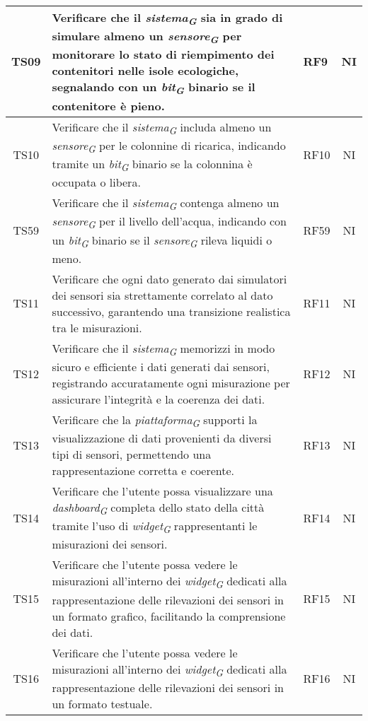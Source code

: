 \begin{longtable}{|c|p{5cm}|>{\raggedright}p{2cm}|c|}
        \hline
        TS09 & Verificare che il \textit{sistema}\textsubscript{\textit{G}} sia in grado di simulare almeno un \textit{sensore}\textsubscript{\textit{G}} per monitorare lo stato di riempimento dei contenitori nelle isole ecologiche, segnalando con un \textit{bit}\textsubscript{\textit{G}} binario se il contenitore è pieno. & RF9 & NI \\
        \hline
        TS10 & Verificare che il \textit{sistema}\textsubscript{\textit{G}} includa almeno un \textit{sensore}\textsubscript{\textit{G}} per le colonnine di ricarica, indicando tramite un \textit{bit}\textsubscript{\textit{G}} binario se la colonnina è occupata o libera. & RF10 & NI \\
        \hline
        TS59 & Verificare che il \textit{sistema}\textsubscript{\textit{G}} contenga almeno un \textit{sensore}\textsubscript{\textit{G}} per il livello dell'acqua, indicando con un \textit{bit}\textsubscript{\textit{G}} binario se il \textit{sensore}\textsubscript{\textit{G}} rileva liquidi o meno. & RF59 & NI \\
        \hline
        TS11 & Verificare che ogni dato generato dai simulatori dei sensori sia strettamente correlato al dato successivo, garantendo una transizione realistica tra le misurazioni. & RF11 & NI \\
        \hline
        TS12 & Verificare che il \textit{sistema}\textsubscript{\textit{G}} memorizzi in modo sicuro e efficiente i dati generati dai sensori, registrando accuratamente ogni misurazione per assicurare l'integrità e la coerenza dei dati. & RF12 & NI \\
        \hline
        TS13 & Verificare che la \textit{piattaforma}\textsubscript{\textit{G}} supporti la visualizzazione di dati provenienti da diversi tipi di sensori, permettendo una rappresentazione corretta e coerente. & RF13 & NI \\
        \hline
        TS14 & Verificare che l'utente possa visualizzare una \textit{dashboard}\textsubscript{\textit{G}} completa dello stato della città tramite l'uso di \textit{widget}\textsubscript{\textit{G}} rappresentanti le misurazioni dei sensori. & RF14 & NI \\
        \hline
        TS15 & Verificare che l'utente possa vedere le misurazioni all'interno dei \textit{widget}\textsubscript{\textit{G}} dedicati alla rappresentazione delle rilevazioni dei sensori in un formato grafico, facilitando la comprensione dei dati. & RF15 & NI \\
        \hline
        TS16 & Verificare che l'utente possa vedere le misurazioni all'interno dei \textit{widget}\textsubscript{\textit{G}} dedicati alla rappresentazione delle rilevazioni dei sensori in un formato testuale. & RF16 & NI \\

\end{longtable}
